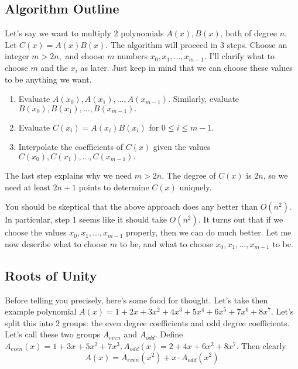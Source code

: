 \subsection{Algorithm Outline}

Let's say we want to multiply 2 polynomials $A(x), B(x)$, both of degree $n$. Let $C(x) = A(x)B(x).$ The algorithm will proceed in 3 steps. Choose an integer $m > 2n,$ and choose $m$ numbers $x_0, x_1, \dots, x_{m-1}.$ I'll clarify what to choose $m$ and the $x_i$ as later. Just keep in mind that we can choose these values to be anything we want.

\begin{enumerate}

\item Evaluate $A(x_0), A(x_1), \dots, A(x_{m-1}).$ Similarly, evaluate $B(x_0), B(x_1), \dots, B(x_{m-1}).$

\item Evaluate $C(x_i) = A(x_i)B(x_i)$ for $0 \le i \le m-1.$

\item Interpolate the coefficients of $C(x)$ given the values $C(x_0), C(x_1), \dots, C(x_{m-1}).$

\end{enumerate}

The last step explains why we need $m > 2n.$ The degree of $C(x)$ is $2n$, so we need at least $2n+1$ points to determine $C(x)$ uniquely.

You should be skeptical that the above approach does any better than $O(n^2).$ In particular, step 1 seems like it should take $O(n^2).$ It turns out that if we choose the values $x_0, x_1, \dots, x_{m-1}$ properly, then we can do much better. Let me now describe what to choose $m$ to be, and what to choose $x_0, x_1, \dots, x_{m-1}$ to be.

\subsection{Roots of Unity}

Before telling you precisely, here's some food for thought. Let's take then example polynomial $A(x) = 1+2x+3x^2+4x^3+5x^4+6x^5+7x^6+8x^7.$ Let's split this into 2 groups: the even degree coefficients and odd degree coefficients. Let's call these two groups $A_{even}$ and $A_{odd}.$ Define $A_{even}(x) = 1+3x+5x^2+7x^3, A_{odd}(x) = 2+4x+6x^2+8x^7.$ Then clearly \[ A(x) = A_{even}(x^2) + x \cdot A_{odd}(x^2) \]

